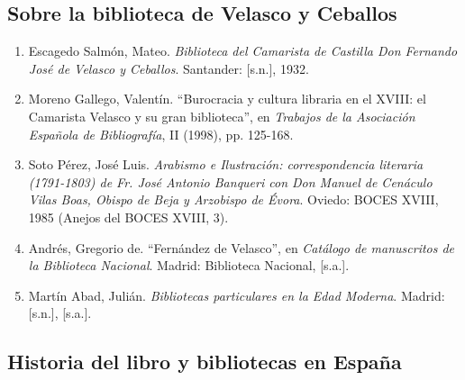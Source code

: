 \documentclass[12pt,a4paper]{article}
\begin{document}
\subsection{Sobre la biblioteca de Velasco y Ceballos}

\begin{enumerate}
    \item Escagedo Salmón, Mateo. \textit{Biblioteca del Camarista de Castilla Don Fernando José de Velasco y Ceballos}. Santander: [s.n.], 1932.

    \item Moreno Gallego, Valentín. ``Burocracia y cultura libraria en el XVIII: el Camarista Velasco y su gran biblioteca'', en \textit{Trabajos de la Asociación Española de Bibliografía}, II (1998), pp. 125-168.

    \item Soto Pérez, José Luis. \textit{Arabismo e Ilustración: correspondencia literaria (1791-1803) de Fr. José Antonio Banqueri con Don Manuel de Cenáculo Vilas Boas, Obispo de Beja y Arzobispo de Évora}. Oviedo: BOCES XVIII, 1985 (Anejos del BOCES XVIII, 3).

    \item Andrés, Gregorio de. ``Fernández de Velasco'', en \textit{Catálogo de manuscritos de la Biblioteca Nacional}. Madrid: Biblioteca Nacional, [s.a.].

    \item Martín Abad, Julián. \textit{Bibliotecas particulares en la Edad Moderna}. Madrid: [s.n.], [s.a.].
\end{enumerate}

\subsection{Historia del libro y bibliotecas en España}
\end{document}
